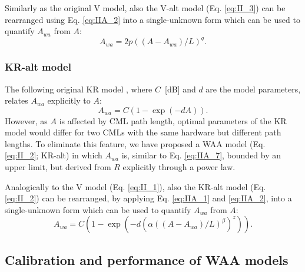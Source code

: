 \documentclass{ctuthesis}\usepackage[]{graphicx}\usepackage[]{color}
\begin{document}
Similarly as the original V model, also the V-alt model (Eq. \ref{eq:II_3}) can be rearranged using Eq. \ref{eq:IIA_2} into a single-unknown form which can be used to quantify $A_{wa}$ from $A$:
\begin{equation} \label{eq:IIA_6}
        A_{wa} = 2 p  ((A - A_{wa}) / L) ^q. 
\end{equation}


\subsubsection{KR-alt model}
The following original KR model \citep{kharadlyEffectWetAntenna2001}, where $C$~[dB] and $d$ are the model parameters, relates $A_{wa}$ explicitly to $A$:
\begin{equation} \label{eq:IIA_7}
        A_{wa} = C ( 1 - \exp (-dA) ). 
\end{equation}
However, as $A$ is affected by CML path length, optimal parameters of the KR model would differ for two CMLs with the same hardware but different path lengths. To eliminate this feature, we have proposed a WAA model (Eq. \ref{eq:II_2}; KR-alt) in which $A_{wa}$ is, similar to Eq. \ref{eq:IIA_7}, bounded by an upper limit, but derived from $R$ explicitly through a power law.

Analogically to the V model (Eq. \ref{eq:II_1}), also the KR-alt model (Eq. \ref{eq:II_2}) can be rearranged, by applying Eq. \ref{eq:IIA_1} and \ref{eq:IIA_2}, into a single-unknown form which can be used to quantify $A_{wa}$ from $A$:
\begin{equation} \label{eq:IIA_8}
        A_{wa} = C (1 - \exp (-d(\alpha ((A - A_{wa} )  / L)^\beta )^z )  ).
\end{equation}



\subsection{Calibration and performance of WAA models} \label{paperIIMethC}
\end{document}
